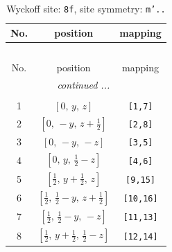 \documentclass[fleqn,8pt]{jsarticle}
\begin{document}
\begin{longtable}{ccc}
\caption{Wyckoff site: {\tt 8f}, site symmetry: {\tt m'..}}
 \\
 \hline \hline
No. & position & mapping \\ \hline \endfirsthead

\multicolumn{2}{l}{\tablename\ \thetable{}} \\
 \hline \hline
No. & position & mapping \\ \hline \endhead

 \hline \hline
\multicolumn{2}{r}{\footnotesize\it continued ...} \\ \endfoot

 \hline \hline
\multicolumn{2}{r}{} \\ \endlastfoot

1 & $\left[ 0,\, y,\, z \right]$ & {\tt [1,7]} \\ \hline
2 & $\left[ 0,\, - y,\, z + \frac{1}{2} \right]$ & {\tt [2,8]} \\ \hline
3 & $\left[ 0,\, - y,\, - z \right]$ & {\tt [3,5]} \\ \hline
4 & $\left[ 0,\, y,\, \frac{1}{2} - z \right]$ & {\tt [4,6]} \\ \hline
5 & $\left[ \frac{1}{2},\, y + \frac{1}{2},\, z \right]$ & {\tt [9,15]} \\ \hline
6 & $\left[ \frac{1}{2},\, \frac{1}{2} - y,\, z + \frac{1}{2} \right]$ & {\tt [10,16]} \\ \hline
7 & $\left[ \frac{1}{2},\, \frac{1}{2} - y,\, - z \right]$ & {\tt [11,13]} \\ \hline
8 & $\left[ \frac{1}{2},\, y + \frac{1}{2},\, \frac{1}{2} - z \right]$ & {\tt [12,14]} \\
\end{longtable}
\renewcommand{\arraystretch}{1.2}
\end{document}
